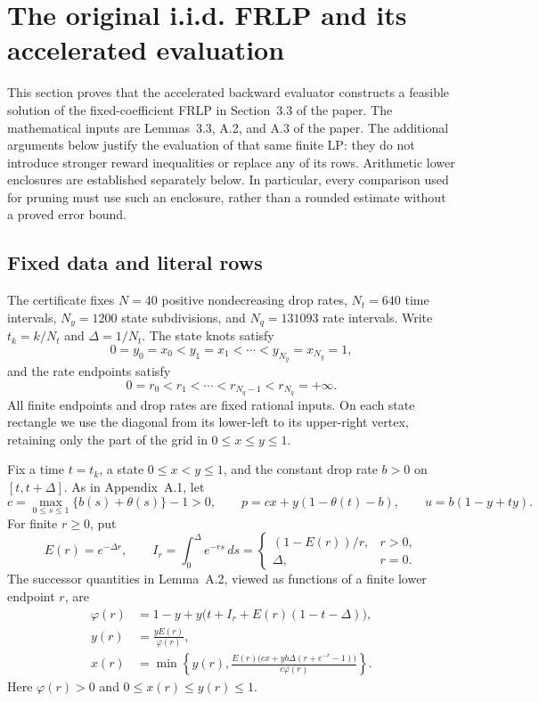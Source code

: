 
\section{The original i.i.d. FRLP and its accelerated evaluation}
\label{sec:cert-iid-math}

This section proves that the accelerated backward evaluator constructs a
feasible solution of the fixed-coefficient FRLP in Section~3.3 of the paper.
The mathematical inputs are Lemmas~3.3, A.2, and A.3 of the paper.  The
additional arguments below justify the evaluation of that same finite LP:
they do not introduce stronger reward inequalities or replace any of its
rows.  Arithmetic lower enclosures are established separately below.  In
particular, every comparison used for pruning must use such an enclosure,
rather than a rounded estimate without a proved error bound.

\subsection{Fixed data and literal rows}
\label{sec:cert-iid-rows}

The certificate fixes $N=40$ positive nondecreasing drop rates, $N_t=640$
time intervals, $N_y=1200$ state subdivisions, and $N_q=131093$ rate
intervals.  Write $t_k=k/N_t$ and $\Delta=1/N_t$.  The state knots satisfy
\[
  0=y_0=x_0<y_1=x_1<\cdots<y_{N_y}=x_{N_y}=1,
\]
and the rate endpoints satisfy
\[
  0=r_0<r_1<\cdots<r_{N_q-1}<r_{N_q}=+\infty.
\]
All finite endpoints and drop rates are fixed rational inputs.  On each
state rectangle we use the diagonal from its lower-left to its upper-right
vertex, retaining only the part of the grid in $0\le x\le y\le1$.

Fix a time $t=t_k$, a state $0\le x<y\le1$, and the constant drop rate $b>0$
on $[t,t+\Delta]$.  As in Appendix~A.1, let
\[
 c=\max_{0\le s\le1}\{b(s)+\theta(s)\}-1>0,\qquad
 p=cx+y(1-\theta(t)-b),\qquad u=b(1-y+ty).
\]
For finite $r\ge0$, put
\[
 E(r)=e^{-\Delta r},\qquad
 I_r=\int_0^\Delta e^{-rs}\,ds
     =\begin{cases}(1-E(r))/r,&r>0,\\ \Delta,&r=0.\end{cases}
\]
The successor quantities in Lemma~A.2, viewed as functions of a finite
lower endpoint $r$, are
\begin{align}
 \varphi(r)&=1-y+y\bigl(t+I_r+E(r)(1-t-\Delta)\bigr),\label{eq:cert-iid-phi}\\
 y(r)&=\frac{yE(r)}{\varphi(r)},\label{eq:cert-iid-y}\\
 x(r)&=\min\!\left\{y(r),
   \frac{E(r)\bigl(cx+yb\Delta(r+e^{-r}-1)\bigr)}{c\varphi(r)}\right\}.
 \label{eq:cert-iid-x}
\end{align}
Here $\varphi(r)>0$ and $0\le x(r)\le y(r)\le1$.

